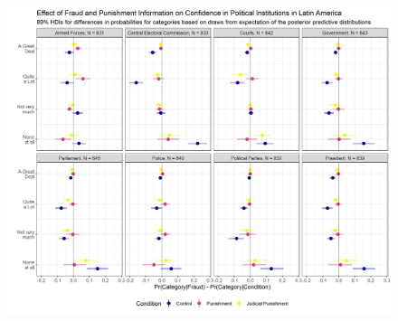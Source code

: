 \documentclass[11pt, ngerman,english,a4]{article}
\begin{document}





\begin{figure}[H]
    \centering
    \includegraphics[width=\linewidth,trim=4 4 4 4,clip]{figs/la_hdi89.png}\\
\end{figure}
\end{document}
